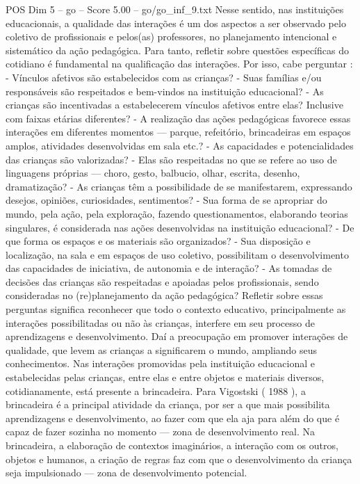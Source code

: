 \begin{textsample}{POS Dim 5 – go – Score 5.00 – go/go\_inf\_9.txt}
Nesse sentido, nas instituições educacionais, a qualidade das interações é um dos aspectos a ser observado pelo coletivo de profissionais e pelos(as) professores, no planejamento intencional e sistemático da ação pedagógica.
Para tanto, refletir sobre questões específicas do cotidiano é fundamental na qualificação das interações.
Por isso, cabe perguntar : - Vínculos afetivos são estabelecidos com as crianças? - Suas famílias e/ou responsáveis são respeitados e bem-vindos na instituição educacional? - As crianças são incentivadas a estabelecerem vínculos afetivos entre elas?
Inclusive com faixas etárias diferentes? - A realização das ações pedagógicas favorece essas interações em diferentes momentos — parque, refeitório, brincadeiras em espaços amplos, atividades desenvolvidas em sala etc.? - As capacidades e potencialidades das crianças são valorizadas? - Elas são respeitadas no que se refere ao uso de linguagens próprias — choro, gesto, balbucio, olhar, escrita, desenho, dramatização? - As crianças têm a possibilidade de se manifestarem, expressando desejos, opiniões, curiosidades, sentimentos? - Sua forma de se apropriar do mundo, pela ação, pela exploração, fazendo questionamentos, elaborando teorias singulares, é considerada nas ações desenvolvidas na instituição educacional? - De que forma os espaços e os materiais são organizados? - Sua disposição e localização, na sala e em espaços de uso coletivo, possibilitam o desenvolvimento das capacidades de iniciativa, de autonomia e de interação? - As tomadas de decisões das crianças são respeitadas e apoiadas pelos profissionais, sendo consideradas no (re)planejamento da ação pedagógica?
Refletir sobre essas perguntas significa reconhecer que todo o contexto educativo, principalmente as interações possibilitadas ou não às crianças, interfere em seu processo de aprendizagens e desenvolvimento.
Daí a preocupação em promover interações de qualidade, que levem as crianças a significarem o mundo, ampliando seus conhecimentos.
Nas interações promovidas pela instituição educacional e estabelecidas pelas crianças, entre elas e entre objetos e materiais diversos, cotidianamente, está presente a brincadeira.
Para Vigostski ( 1988 ), a brincadeira é a principal atividade da criança, por ser a que mais possibilita aprendizagens e desenvolvimento, ao fazer com que ela aja para além do que é capaz de fazer sozinha no momento — zona de desenvolvimento real.
Na brincadeira, a elaboração de contextos imaginários, a interação com os outros, objetos e humanos, a criação de regras faz com que o desenvolvimento da criança seja impulsionado — zona de desenvolvimento potencial.

\end{textsample}
